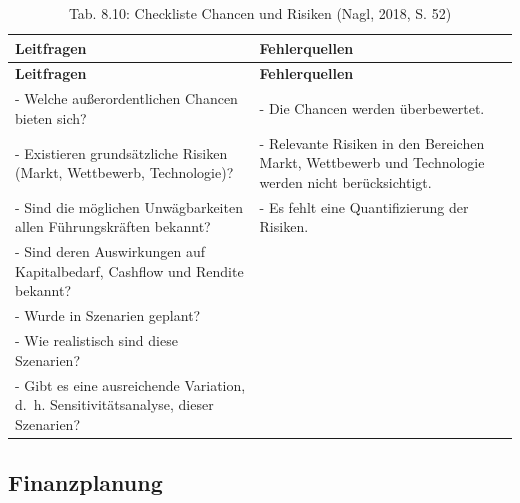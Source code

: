 \documentclass[
  letterpaper,
]{book}
\begin{document}
\begin{longtable}[]{@{}
  >{\raggedright\arraybackslash}p{}
  >{\raggedright\arraybackslash}p{}@{}}
\caption{Tab. 8.10: Checkliste Chancen und Risiken (Nagl, 2018, S.
52)}\tabularnewline
\toprule\noalign{}
\begin{minipage}[b]{\linewidth}\raggedright
\textbf{Leitfragen}
\end{minipage} & \begin{minipage}[b]{\linewidth}\raggedright
\textbf{Fehlerquellen}
\end{minipage} \\
\midrule\noalign{}
\endfirsthead
\toprule\noalign{}
\begin{minipage}[b]{\linewidth}\raggedright
\textbf{Leitfragen}
\end{minipage} & \begin{minipage}[b]{\linewidth}\raggedright
\textbf{Fehlerquellen}
\end{minipage} \\
\midrule\noalign{}
\endhead
\bottomrule\noalign{}
\endlastfoot
- Welche außerordentlichen Chancen bieten sich? & - Die Chancen werden
überbewertet. \\
- Existieren grundsätzliche Risiken (Markt, Wettbewerb, Technologie)? &
- Relevante Risiken in den Bereichen Markt, Wettbewerb und Technologie
werden nicht berücksichtigt. \\
- Sind die möglichen Unwägbarkeiten allen Führungskräften bekannt? & -
Es fehlt eine Quantifizierung der Risiken. \\
- Sind deren Auswirkungen auf Kapitalbedarf, Cashflow und Rendite
bekannt? & \\
- Wurde in Szenarien geplant? & \\
- Wie realistisch sind diese Szenarien? & \\
- Gibt es eine ausreichende Variation, d.~h. Sensitivitätsanalyse,
dieser Szenarien? & \\
\end{longtable}

\subsection{Finanzplanung}\label{finanzplanung}
\end{document}
